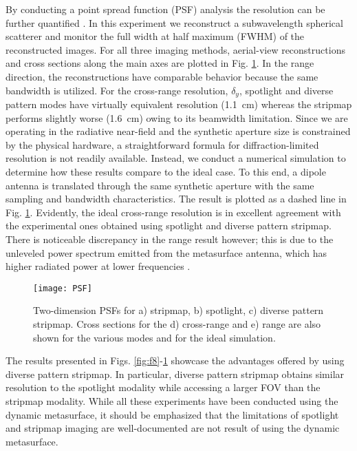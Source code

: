 \documentclass[journal]{IEEEtran}
\begin{document}
By conducting a point spread function (PSF) analysis the resolution can be further quantified \cite{yurduseven2015PSF}. In this experiment we reconstruct a subwavelength spherical scatterer and monitor the full width at half maximum (FWHM) of the reconstructed images. For all three imaging methods, aerial-view reconstructions and cross sections along the main axes are plotted in Fig. \ref{fig:f10}. In the range direction, the reconstructions have comparable behavior because the same bandwidth is utilized. For the cross-range resolution, $\delta_y$, spotlight and diverse pattern modes have virtually equivalent resolution (\SI{1.1}{\centi\meter}) whereas the stripmap performs slightly worse (\SI{1.6}{\centi\meter}) owing to its beamwidth limitation. Since we are operating in the radiative near-field and the synthetic aperture size is constrained by the physical hardware, a straightforward formula for diffraction-limited resolution is not readily available. Instead, we conduct a numerical simulation to determine how these results compare to the ideal case. To this end, a dipole antenna is translated through the same synthetic aperture with the same sampling and bandwidth characteristics. The result is plotted as a dashed line in Fig. \ref{fig:f10}. Evidently, the ideal cross-range resolution is in excellent agreement with the experimental ones obtained using spotlight and diverse pattern stripmap. There is noticeable discrepancy in the range result however; this is due to the unleveled power spectrum emitted from the metasurface antenna, which has higher radiated power at lower frequencies \cite{sleasmanMarathon}.

\begin{figure} 
	\centering
	\texttt{[image: PSF]}
	\caption{\label{fig:f10}Two-dimension PSFs for a) stripmap, b) spotlight, c) diverse pattern stripmap. Cross sections for the d) cross-range and e) range are also shown for the various modes and for the ideal simulation.}
\end{figure}

The results presented in Figs. \ref{fig:f8}-\ref{fig:f10} showcase the advantages offered by using diverse pattern stripmap. In particular, diverse pattern stripmap obtains similar resolution to the spotlight modality while accessing a larger FOV than the stripmap modality. While all these experiments have been conducted using the dynamic metasurface, it should be emphasized that the limitations of spotlight and stripmap imaging are well-documented are not result of using the dynamic metasurface.
\end{document}
